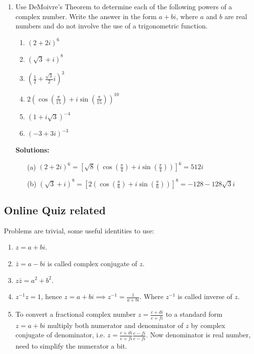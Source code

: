 \documentclass{article}
\begin{document}
\begin{enumerate}
\item Use DeMoivre's Theorem to determine each of the following powers of a complex number. Write the answer in the form $a+b i$, where $a$ and $b$ are real numbers and do not involve the use of a trigonometric function.
\begin{enumerate}
\item $(2+2 i)^6$
\item $(\sqrt{3}+i)^8$ 
\item $\left(\frac{1}{2}+\frac{\sqrt{3}}{2} i\right)^3$ 
\item $2\left(\cos \left(\frac{\pi}{15}\right)+i \sin \left(\frac{\pi}{15}\right)\right)^{10}$ 
\item $(1+i \sqrt{3})^{-4}$ 
\item $(-3+3 i)^{-3}$
\end{enumerate}

\textbf{Solutions:}
  \begin{enumerate}
    \item[(a)] $(2+2 i)^6=\left[\sqrt{8}\left(\cos \left(\frac{\pi}{4}\right)+i \sin \left(\frac{\pi}{4}\right)\right)\right]^6=512 i$
    \item[(b)] $(\sqrt{3}+i)^8=\left[2\left(\cos \left(\frac{\pi}{6}\right)+i \sin \left(\frac{\pi}{6}\right)\right)\right]^8=-128-128 \sqrt{3} i$
  \end{enumerate}
\end{enumerate}


\subsection{Online Quiz related}

Problems are trivial, some useful identities to use:
\begin{enumerate}
  \item $z = a+bi$.
  \item $\bar{z}=a-bi$ is called complex conjugate of $z$.
  \item $z\bar{z}=a^2+b^2$.
  \item $z^{-1}z=1$, hence $z=a+bi\implies {z}^{-1}=\frac{1}{a+bi}$. Where $z^{-1}$  is called inverse of $z$.
  \item To convert a fractional complex number $z=\frac{c+di}{e+fi}$ to a standard form $z=a+bi$ multiply both numerator and denominator of $z$ by complex conjugate of denominator, i.e. $z=\frac{c+di}{e+fi}\frac{e-fi}{e-fi}$. Now denominator is real number, need to simplify the numerator a bit.
\end{enumerate}
\end{document}
